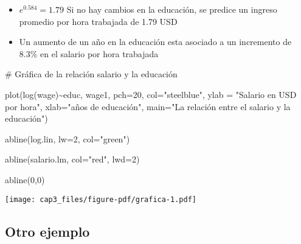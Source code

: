 \documentclass[
  letterpaper,
  DIV=11,
  numbers=noendperiod]{scrreprt}
\newenvironment{Shaded}{\begin{snugshade}}{\end{snugshade}}
\newcommand{\AttributeTok}[1]{\textcolor[rgb]{0.40,0.45,0.13}{#1}}
\newcommand{\CommentTok}[1]{\textcolor[rgb]{0.37,0.37,0.37}{#1}}
\newcommand{\DecValTok}[1]{\textcolor[rgb]{0.68,0.00,0.00}{#1}}
\newcommand{\FunctionTok}[1]{\textcolor[rgb]{0.28,0.35,0.67}{#1}}
\newcommand{\NormalTok}[1]{\textcolor[rgb]{0.00,0.23,0.31}{#1}}
\newcommand{\SpecialCharTok}[1]{\textcolor[rgb]{0.37,0.37,0.37}{#1}}
\newcommand{\StringTok}[1]{\textcolor[rgb]{0.13,0.47,0.30}{#1}}
\begin{document}
\begin{itemize}
\item
  \(e^{0.584}=1.79\) Si no hay cambios en la educación, se predice un
  ingreso promedio por hora trabajada de 1.79 USD
\item
  Un aumento de un año en la educación esta asociado a un incremento de
  8.3\% en el salario por hora trabajada
\end{itemize}

\begin{Shaded}
\begin{Highlighting}[]
\CommentTok{\# Gráfica de la relación salario y la educación}

\FunctionTok{plot}\NormalTok{(}\FunctionTok{log}\NormalTok{(wage)}\SpecialCharTok{\textasciitilde{}}\NormalTok{educ, }
\NormalTok{     wage1,}
     \AttributeTok{pch=}\DecValTok{20}\NormalTok{,}
     \AttributeTok{col=}\StringTok{"steelblue"}\NormalTok{,}
     \AttributeTok{ylab =} \StringTok{"Salario en USD por hora"}\NormalTok{,}
     \AttributeTok{xlab=}\StringTok{"años de educación"}\NormalTok{,}
     \AttributeTok{main=}\StringTok{"La relación entre el salario y la educación"}\NormalTok{)}


\FunctionTok{abline}\NormalTok{(log.lin,}
       \AttributeTok{lw=}\DecValTok{2}\NormalTok{,}
       \AttributeTok{col=}\StringTok{"green"}\NormalTok{)}

\FunctionTok{abline}\NormalTok{(salario.lm,}
       \AttributeTok{col=}\StringTok{"red"}\NormalTok{,}
       \AttributeTok{lwd=}\DecValTok{2}\NormalTok{)}

\FunctionTok{abline}\NormalTok{(}\DecValTok{0}\NormalTok{,}\DecValTok{0}\NormalTok{)}
\end{Highlighting}
\end{Shaded}

\texttt{[image: cap3\_files/figure-pdf/grafica-1.pdf]}

\subsection{Otro ejemplo}\label{otro-ejemplo}
\end{document}
